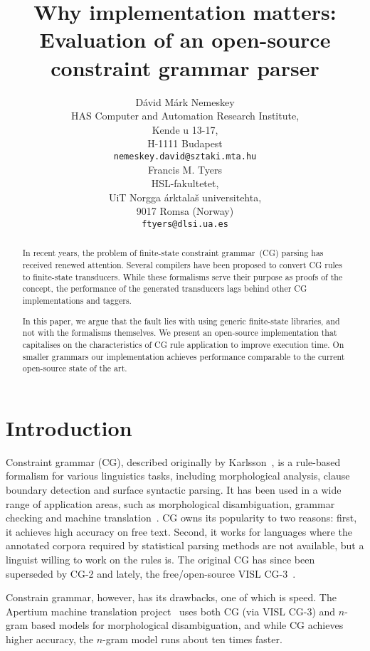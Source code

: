 \documentclass[11pt]{article}
\title{Why implementation matters: Evaluation of an open-source constraint grammar parser}
\author{Dávid Márk Nemeskey \\
HAS Computer and Automation Research Institute, \\
Kende u 13-17, \\
H-1111 Budapest \\
{\tt nemeskey.david@sztaki.mta.hu} \\\And
Francis M. Tyers \\
HSL-fakultetet,\\
UiT Norgga árktalaš universitehta,\\
9017 Romsa (Norway) \\
{\tt ftyers@dlsi.ua.es} \\}
\date{}
\begin{document}
\maketitle

\begin{abstract}
  In recent years, the problem of finite-state constraint grammar~(CG) parsing
  has received renewed attention. Several compilers have been proposed to
  convert CG rules to finite-state transducers. While these formalisms serve
  their purpose as proofs of the concept, the performance of the generated
  transducers lags behind other CG implementations and taggers.
  
  In this paper, we argue that the fault lies with using generic finite-state
  libraries, and not with the formalisms themselves. We present an open-source
  implementation that capitalises on the characteristics of CG rule
  application to improve execution time. On smaller grammars our 
  implementation achieves performance
  comparable to the current open-source state of the art.
\end{abstract}



\section{Introduction}

Constraint grammar (CG), described originally by Karlsson~,
is a rule-based formalism for various linguistics tasks, including morphological
analysis, clause boundary detection and surface syntactic parsing. It has
been used in a wide range of application areas, such as morphological
disambiguation, grammar checking and machine translation~\cite{Bick:2011}. CG
owns its popularity to two reasons: first, it achieves high accuracy on free
text. Second, it works for languages where the annotated corpora required by
statistical parsing methods are not available, but a linguist willing to work on
the rules is. The original CG has since been superseded by CG-2 \cite{Tapanainen:1996} and lately, the free/open-source VISL
CG-3~\cite{Bick:2000,Didriksen:2011}.

Constrain grammar, however, has its drawbacks, one of which is speed. The
Apertium machine translation project~\cite{Apertium:2011} uses both CG (via
VISL CG-3) and $n$-gram based models for morphological disambiguation, and while
CG achieves higher accuracy, the $n$-gram model runs about ten times faster.
\end{document}
